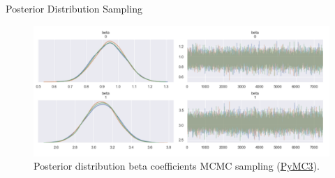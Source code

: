 \documentclass[10pt]{beamer}
\begin{document}
\begin{frame}{Posterior Distribution Sampling }{\cite{pymc3}}
\begin{center}
\begin{figure}
\includegraphics[scale=0.25]{images/lin_posterior_pymc3.png} 
\caption{Posterior distribution beta coefficients MCMC sampling (\href{https://docs.pymc.io/}{PyMC3}).}
\end{figure}
\end{center}
\end{frame}
\end{document}
